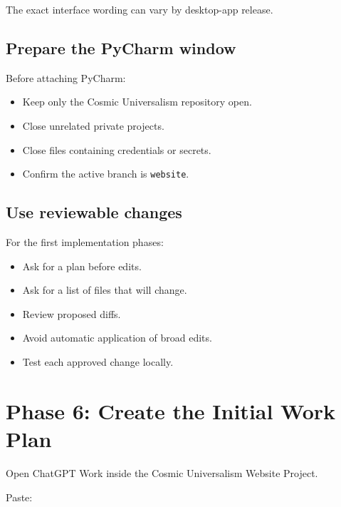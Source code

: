 \documentclass[11pt,letterpaper]{article}
\newcommand{\branchname}[1]{\texttt{#1}}
\begin{document}
The exact interface wording can vary by desktop-app release.

\subsection{Prepare the PyCharm window}

Before attaching PyCharm:

\begin{itemize}
    \item Keep only the Cosmic Universalism repository open.
    \item Close unrelated private projects.
    \item Close files containing credentials or secrets.
    \item Confirm the active branch is \branchname{website}.
\end{itemize}

\subsection{Use reviewable changes}

For the first implementation phases:

\begin{itemize}
    \item Ask for a plan before edits.
    \item Ask for a list of files that will change.
    \item Review proposed diffs.
    \item Avoid automatic application of broad edits.
    \item Test each approved change locally.
\end{itemize}

\section{Phase 6: Create the Initial Work Plan}

Open ChatGPT Work inside the Cosmic Universalism Website Project.

Paste:
\end{document}
